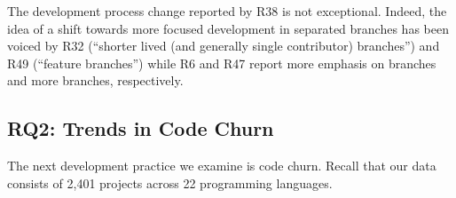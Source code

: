 The development process change reported by R38 is not exceptional. 
Indeed, the idea of a shift towards more focused development in separated branches
has been voiced by R32 (``shorter lived (and generally single contributor) branches'') and
R49 (``feature branches'') while R6 and R47 report more emphasis on branches and more
branches, respectively.




%





\subsection{RQ2: Trends in Code Churn}

The next development practice we examine is code churn.
Recall that our data consists of 2,401 projects across 22 programming languages.

